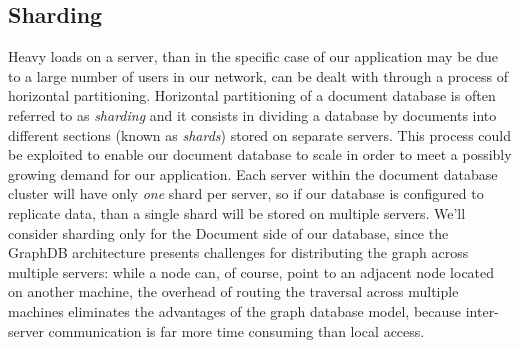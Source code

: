 \subsection{Sharding}
Heavy loads on a server,  than in the specific case of our application may be due to a large number of users in our network, can be dealt with through a process of horizontal partitioning. Horizontal partitioning of a document database is often referred to as \emph{sharding} and it consists in dividing a database by documents into different sections (known as \emph{shards}) stored on separate servers. This process could be exploited to enable our document database to scale in order to meet a possibly growing demand for our application. Each server within the document database cluster will have only \emph{one} shard per server, so if our database is configured to replicate data, than a single shard will be stored on multiple servers. We'll consider sharding only for the Document side of our database, since the GraphDB architecture presents challenges for distributing the graph across multiple
servers: while a node can, of course, point to an adjacent node located on another machine, the overhead of routing the traversal across multiple machines eliminates the advantages of the graph database model, because inter-server communication is far more time consuming than local access. 

